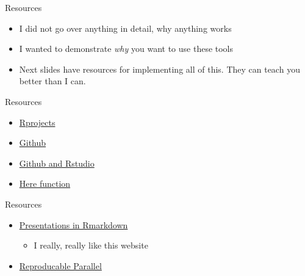 \documentclass[ignorenonframetext,]{beamer}
\providecommand{\tightlist}{%
  \setlength{\itemsep}{0pt}\setlength{\parskip}{0pt}}
\begin{document}
\begin{frame}{Resources}
\protect\hypertarget{resources}{}

\begin{itemize}
\item
  I did not go over anything in detail, why anything works
\item
  I wanted to demonstrate \emph{why} you want to use these tools
\item
  Next slides have resources for implementing all of this. They can
  teach you better than I can.
\end{itemize}

\end{frame}

\begin{frame}{Resources}
\protect\hypertarget{resources-1}{}

\begin{itemize}
\item
  \href{https://support.rstudio.com/hc/en-us/articles/200526207-Using-Projects}{Rprojects}
\item
  \href{https://guides.github.com/activities/hello-world/}{Github}
\item
  \href{https://jennybc.github.io/2014-05-12-ubc/ubc-r/session03_git.html}{Github
  and Rstudio}
\item
  \href{https://github.com/jennybc/here_here}{Here function}
\end{itemize}

\end{frame}

\begin{frame}{Resources}
\protect\hypertarget{resources-2}{}

\begin{itemize}
\tightlist
\item
  \href{http://svmiller.com/blog/2015/02/moving-from-beamer-to-r-markdown/}{Presentations
  in Rmarkdown}

  \begin{itemize}
  \tightlist
  \item
    I really, really like this website
  \end{itemize}
\item
  \href{https://cran.r-project.org/web/packages/doRNG/vignettes/doRNG.pdf}{Reproducable
  Parallel}
\end{itemize}

\end{frame}
\end{document}
